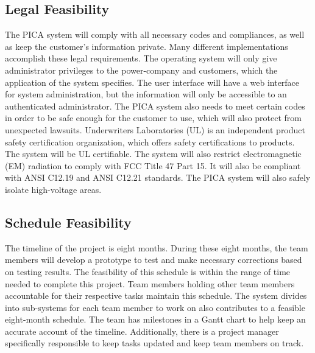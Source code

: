 \subsection{Legal Feasibility}
The PICA system will comply with all necessary codes and compliances, as well as keep the customer’s information private. Many different implementations accomplish these legal requirements. The operating system will only give administrator privileges to the power-company and customers, which the application of the system specifies. The user interface will have a web interface for system administration, but the information will only be accessible to an authenticated administrator. The PICA system also needs to meet certain codes in order to be safe enough for the customer to use, which will also protect from unexpected lawsuits. Underwriters Laboratories (UL) is an independent product safety certification organization, which offers safety certifications to products\cite{UL_Web}.  The system will be UL certifiable. The system will also restrict electromagnetic (EM) radiation to comply with FCC Title 47 Part 15. It will also be compliant with ANSI C12.19 and ANSI C12.21 standards. The PICA system will also safely isolate high-voltage areas.
 
\subsection{Schedule Feasibility}
The timeline of the project is eight months. During these eight months, the team members will develop a prototype to test and make necessary corrections based on testing results. The feasibility of this schedule is within the range of time needed to complete this project. Team members holding other team members accountable for their respective tasks maintain this schedule. The system divides into sub-systems for each team member to work on also contributes to a feasible eight-month schedule. The team has milestones in a Gantt chart to help keep an accurate account of the timeline. Additionally, there is a project manager specifically responsible to keep tasks updated and keep team members on track.

